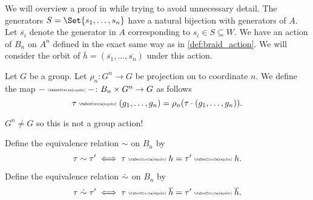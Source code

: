 We will overview a proof in \cite{resteghini_free_2024} while trying to avoid unnecessary detail.
The generators $S = \Set{s_1, \ldots , s_n} $ have a natural bijection with generators of $A$.
Let $\overline{s_i}$ denote the generator in $A$ corresponding to $s_i \in S \subseteq W$.
We have an action of $B_n$ on $A^n$ defined in the exact same way as in \cref{def:braid_action}.
We will consider the orbit of $\overline{h} = (\overline{s_1}, \ldots, \overline{s_n})$ under this action.

\begin{definition}
	Let $G$ be a group.
	Let $\rho_n \colon G^n \to G$ be projection on to coordinate $n$.
	We define the map ${-} \codot {-} \colon B_n \times G^n \to G$ as follows
	\[
		\tau \codot (g_1, \ldots, g_n) = \rho_n(\tau \cdot (g_1, \ldots, g_n))
		.\]
\end{definition}

\begin{remark}
	$G^n \neq G$ so this is not a group action!
\end{remark}

\begin{definition}
	Define the equivalence relation $\sim$ on $B_n$ by
	\[
		\tau \sim \tau^\prime \iff \tau \codot h = \tau^\prime \codot h
		.\]
\end{definition}

\begin{definition}
	Define the equivalence relation $\mathrel{\dot{\sim}}$ on $B_n$ by
	\[
		\tau \dsim \tau^\prime \iff \tau \codot \overline{h} = \tau^\prime \codot \overline{h}
		.\]
\end{definition}


